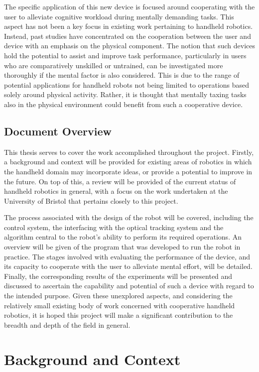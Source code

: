 \documentclass[11pt]{article}
\begin{document}
The specific application of this new device is focused around cooperating with the user to alleviate cognitive workload during mentally demanding tasks. This aspect has not been a key focus in existing work pertaining to handheld robotics. Instead, past studies have concentrated on the cooperation between the user and device with an emphasis on the physical component. The notion that such devices hold the potential to assist and improve task performance, particularly in users who are comparatively unskilled or untrained, can be investigated more thoroughly if the mental factor is also considered. This is due to the range of potential applications for handheld robots not being limited to operations based solely around physical activity. Rather, it is thought that mentally taxing tasks also in the physical environment could benefit from such a cooperative device.

\subsection{Document Overview}
This thesis serves to cover the work accomplished throughout the project. Firstly, a background and context will be provided for existing areas of robotics in which the handheld domain may incorporate ideas, or provide a potential to improve in the future. On top of this, a review will be provided of the current status of handheld robotics in general, with a focus on the work undertaken at the University of Bristol that pertains closely to this project.

The process associated with the design of the robot will be covered, including the control system, the interfacing with the optical tracking system and the algorithm central to the robot's ability to perform its required operations. An overview will be given of the program that was developed to run the robot in practice. The stages involved with evaluating the performance of the device, and its capacity to cooperate with the user to alleviate mental effort, will be detailed. Finally, the corresponding results of the experiments will be presented and discussed to ascertain the capability and potential of such a device with regard to the intended purpose. Given these unexplored aspects, and considering the relatively small existing body of work concerned with cooperative handheld robotics, it is hoped this project will make a significant contribution to the breadth and depth of the field in general.

\pagebreak
\section{Background and Context}
\end{document}
